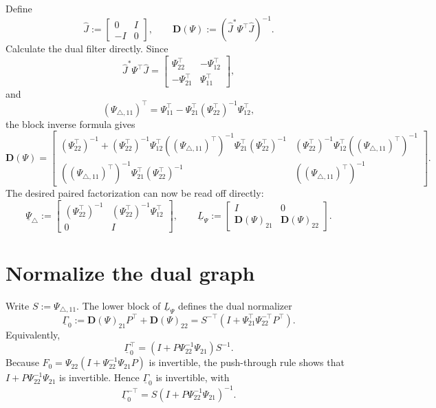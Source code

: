 \documentclass[11pt]{article}
\newcommand{\bmat}[1]{\begin{bmatrix}#1\end{bmatrix}}
\begin{document}
Define
\begin{equation*}
 \widehat J:=\bmat{0&I\\-I&0},
 \qquad
 \mathbf D(\Psi):=(\widehat J^*\Psi^\top\widehat J)^{-1}.
\end{equation*}
Calculate the dual filter directly.  Since
\begin{equation*}
 \widehat J^*\Psi^\top\widehat J
 =\bmat{
 \Psi_{22}^\top&-\Psi_{12}^\top\\
 -\Psi_{21}^\top&\Psi_{11}^\top
 },
\end{equation*}
and
\begin{equation*}
 (\Psi_{\triangle,11})^\top
 =\Psi_{11}^\top
  -\Psi_{21}^\top(\Psi_{22}^\top)^{-1}\Psi_{12}^\top,
\end{equation*}
the block inverse formula gives
\begin{equation*}
 \mathbf D(\Psi)
 =\bmat{
 (\Psi_{22}^\top)^{-1}
 +(\Psi_{22}^\top)^{-1}\Psi_{12}^\top
  ((\Psi_{\triangle,11})^\top)^{-1}
  \Psi_{21}^\top(\Psi_{22}^\top)^{-1}
 &
 (\Psi_{22}^\top)^{-1}\Psi_{12}^\top
  ((\Psi_{\triangle,11})^\top)^{-1}
 \\
 ((\Psi_{\triangle,11})^\top)^{-1}
  \Psi_{21}^\top(\Psi_{22}^\top)^{-1}
 &
 ((\Psi_{\triangle,11})^\top)^{-1}
 }.
\end{equation*}
The desired paired factorization can now be read off directly:
\begin{equation*}
 \underline\Psi_\triangle
 :=\bmat{
 (\Psi_{22}^\top)^{-1}
 &(\Psi_{22}^\top)^{-1}\Psi_{12}^\top\\
 0&I
 },
 \qquad
 \underline L_\Psi
 :=\bmat{
 I&0\\
 \mathbf{D}(\Psi)_{21}
 &\mathbf{D}(\Psi)_{22}
 }.
\end{equation*}

\section*{Normalize the dual graph}

Write $S:=\Psi_{\triangle,11}$.  The lower block of $\underline L_\Psi$
defines the dual normalizer
\begin{equation*}
 \underline\Gamma_0
 :=\mathbf D(\Psi)_{21}P^\top+\mathbf D(\Psi)_{22}
 =S^{-\top}\left(I+\Psi_{21}^\top
  \Psi_{22}^{-\top}P^\top\right).
\end{equation*}
Equivalently,
\begin{equation*}
 \underline\Gamma_0^\top
 =\left(I+P\Psi_{22}^{-1}\Psi_{21}\right)S^{-1}.
\end{equation*}
Because $F_0=\Psi_{22}(I+\Psi_{22}^{-1}\Psi_{21}P)$ is invertible, the
push-through rule shows that $I+P\Psi_{22}^{-1}\Psi_{21}$ is invertible.
Hence $\underline\Gamma_0$ is invertible, with
\begin{equation*}
 \underline\Gamma_0^{-\top}
 =S\left(I+P\Psi_{22}^{-1}\Psi_{21}\right)^{-1}.
\end{equation*}
\end{document}
